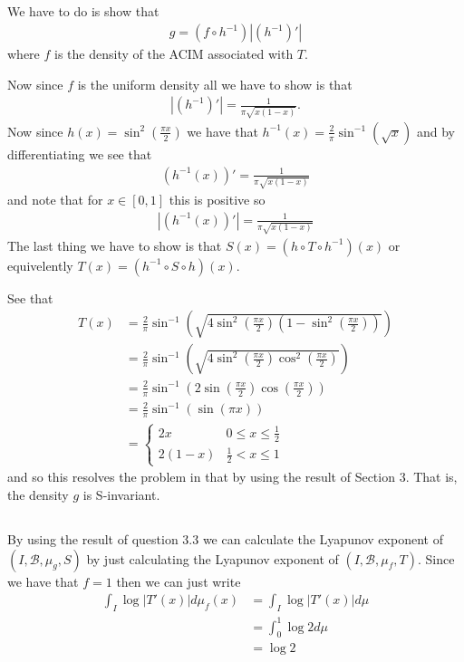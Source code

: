 \documentclass{unswmaths}
\begin{document}
\subsection{}
We have to do is show that 
\begin{align}
  g = (f \circ h^{-1})|\left( h^{-1} \right)'|
\end{align}
where $ f $ is the density of the ACIM associated with $ T $.

Now since $ f $ is the uniform density all we have to show is that
\begin{align}
 |\left( h^{-1} \right)'| = \frac{1}{\pi\sqrt{x(1-x)}}.
\end{align}
Now since $ h(x) = \sin^2(\frac{\pi x}{2}) $ we have that $ h^{-1}(x) = \frac{2}{\pi} \sin^{-1}(\sqrt{x}) $ and by differentiating we see that
\begin{align}
  \left( h^{-1}(x) \right)' = \frac{1}{\pi\sqrt{x(1-x)}}
\end{align}
and note that for $ x \in [0,1] $ this is positive so 
\begin{align}
| (h^{-1}(x))' | = \frac{1}{\pi\sqrt{x(1-x)}}
\end{align}
The last thing we have to show is that $ S(x) = \left( h \circ T \circ h^{-1} \right)(x) $ or equivelently $ T(x) = \left(h^{-1} \circ S \circ h \right)(x) $.

See that
\begin{align}
  T(x) &= \frac{2}{\pi} \sin^{-1}\left( \sqrt{4\sin^2\left(\frac{\pi  x}{2}\right)\left(1-\sin^2\left(\frac{\pi  x}{2}\right)\right) } \right) \\
    &= \frac{2}{\pi} \sin^{-1}\left( \sqrt{4\sin^2\left(\frac{\pi  x}{2}\right)\cos^2\left(\frac{\pi  x}{2}\right) } \right) \\
    &= \frac{2}{\pi} \sin^{-1}\left( 2 \sin\left(\frac{\pi  x}{2}\right)\cos\left(\frac{\pi  x}{2}\right) \right) \\
    &= \frac{2}{\pi} \sin^{-1}\left(  \sin\left(\pi  x\right)\right) \\
    &= \begin{cases} 2x & 0 \leq x \leq \frac{1}{2} \\ 2(1-x)  & \frac{1}{2} < x \leq 1 \end{cases}
\end{align}
and so this resolves the problem in that by using the result of Section 3.
That is, the density $ g $ is S-invariant.

\subsection{}
By using the result of question 3.3 we can calculate the  Lyapunov exponent of $ (I, \mathcal{B}, \mu_g, S) $ by just calculating the  Lyapunov exponent of $ (I, \mathcal{B}, \mu_f, T ) $. Since we have that $ f = 1 $ then we can just write
\begin{align}
  \int_{I} \log |T'(x)| d\mu_f(x) &= \int_{I} \log |T'(x)| d\mu \\
    &= \int_{0}^{1} \log 2 d\mu \\
    &= \log 2
\end{align}
\end{document}
